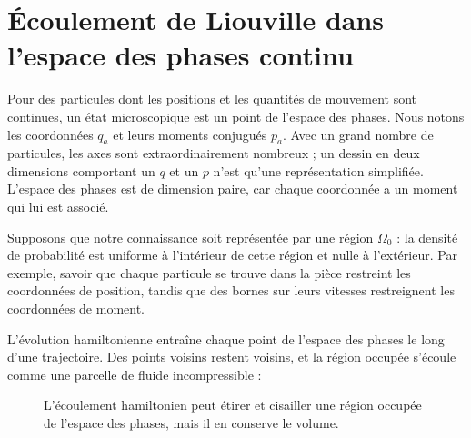\begin{classroomqa}
\end{classroomqa}

\section{Écoulement de Liouville dans l’espace des phases continu}

Pour des particules dont les positions et les quantités de mouvement sont continues, un état microscopique est un point de l’espace des phases. Nous notons les coordonnées \(q_a\) et leurs moments conjugués \(p_a\). Avec un grand nombre de particules, les axes sont extraordinairement nombreux ; un dessin en deux dimensions comportant un \(q\) et un \(p\) n’est qu’une représentation simplifiée. L’espace des phases est de dimension paire, car chaque coordonnée a un moment qui lui est associé.

Supposons que notre connaissance soit représentée par une région \(\Omega_0\) : la densité de probabilité est uniforme à l’intérieur de cette région et nulle à l’extérieur. Par exemple, savoir que chaque particule se trouve dans la pièce restreint les coordonnées de position, tandis que des bornes sur leurs vitesses restreignent les coordonnées de moment.

L’évolution hamiltonienne entraîne chaque point de l’espace des phases le long d’une trajectoire. Des points voisins restent voisins, et la région occupée s’écoule comme une parcelle de fluide incompressible :
\begin{figure}[htbp]
\centering
{}
L’écoulement hamiltonien peut étirer et cisailler une région occupée de l’espace des phases, mais il en conserve le volume.\caption{
}
\label{fig:sm1-liouville-flow}
\end{figure}

